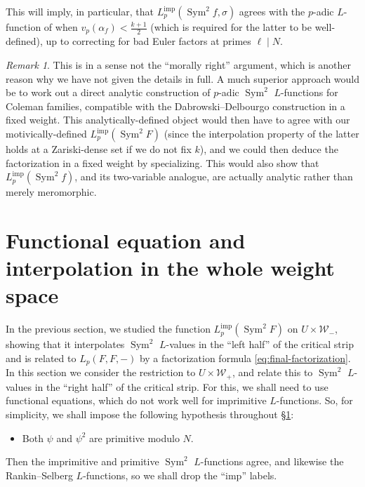 \documentclass[11pt, a4paper, reqno]{amsart}
\theoremstyle{definition}
\theoremstyle{plain}
\theoremstyle{remark}
\newtheorem*{remark}{Remark}
\DeclareMathOperator{\Sym}{Sym}
\newcommand{\Weight}{\mathcal{W}}
\newcommand{\Limp}{L^{\mathrm{imp}}}
\begin{document}
  This will imply, in particular, that $\Limp_p(\Sym^2 f, \sigma)$ agrees with the $p$-adic $L$-function of \cite{dabrowskidelbourgo97} when $v_p(\alpha_f) < \tfrac{k + 1}{2}$ (which is required for the latter to be well-defined), up to correcting for bad Euler factors at primes $\ell \mid N$.

  \begin{remark}
   This is in a sense not the ``morally right'' argument, which is another reason why we have not given the details in full. A much superior approach would be to work out a direct analytic construction of $p$-adic $\Sym^2$ $L$-functions for Coleman families, compatible with the Dabrowski--Delbourgo construction in a fixed weight. This analytically-defined object would then have to agree with our motivically-defined $\Limp_p(\Sym^2 F)$ (since the interpolation property of the latter holds at a Zariski-dense set if we do not fix $k$),  and we could then deduce the factorization in a fixed weight by specializing. This would also show that $\Limp_p(\Sym^2 f)$, and its two-variable analogue, are actually analytic rather than merely meromorphic.
  \end{remark}

\section{Functional equation and interpolation in the whole weight space}
 \label{sec:functional-eq-interpolation-whole}


 In the previous section, we studied the function $\Limp_p(\Sym^2 F)$ on $U \times \Weight_-$, showing that it interpolates $\Sym^2$ $L$-values in the ``left half'' of the critical strip and is related to $L_p(F, F, -)$ by a factorization formula \eqref{eq:final-factorization}. In this section we consider the restriction to $U \times \Weight_+$, and relate this to $\Sym^2$ $L$-values in the ``right half'' of the critical strip. For this, we shall need to use functional equations, which do not work well for imprimitive $L$-functions. So, for simplicity, we shall impose the following hypothesis throughout \S\ref{sec:functional-eq-interpolation-whole}:
  \begin{itemize}
  \item Both $\psi$ and $\psi^2$ are primitive modulo $N$.
  \end{itemize}

  Then the imprimitive and primitive $\Sym^2$ $L$-functions agree, and likewise the Rankin--Selberg $L$-functions, so we shall drop the ``$\mathrm{imp}$'' labels.
\end{document}
